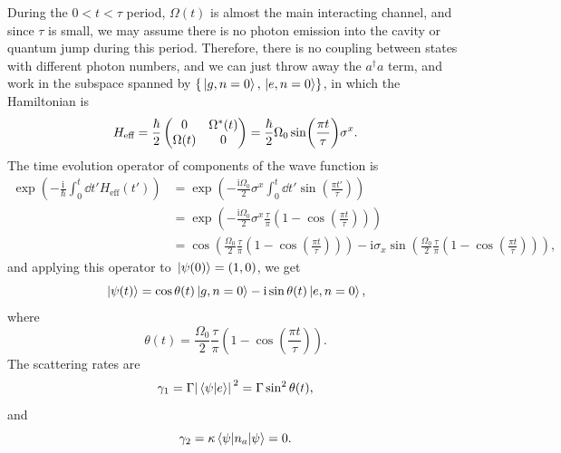 \documentclass[hyperref, a4paper]{article}
\newcommand*{\ii}{\mathrm{i}}
\begin{document}
\begin{itemize}
During the $0 < t < \tau$ period, $\Omega(t)$ is almost the main interacting channel, and since $\tau$ is small,
we may assume there is no photon emission into the cavity or quantum jump during this period.
Therefore, there is no coupling between states with different photon numbers, and we can just throw away 
the $a^\dagger a$ term, and work in the subspace spanned by $\{\ket*{g, n=0}, \ket*{e, n=0}\}$, in which 
the Hamiltonian is 
\begin{equation}
    H_\text{eff} = \frac{\hbar}{2} \pmqty{ 0 & \Omega^*(t) \\ \Omega(t) & 0 } 
    = \frac{\hbar}{2} \Omega_0 \sin(\frac{\pi t}{\tau}) \sigma^x .
\end{equation} 
The time evolution operator of components of the wave function is 
\[
    \begin{aligned}
        \exp(- \frac{\ii}{\hbar} \int_0^t \dd{t'} H_\text{eff}(t')) &= 
        \exp(- \frac{\ii \Omega_0}{2} \sigma^x \int_0^t \dd{t'} \sin(\frac{\pi t'}{\tau}) ) \\
        &= \exp(- \frac{\ii \Omega_0}{2} \sigma^x \frac{\tau}{\pi} \left( 1 - \cos(\frac{\pi t}{\tau}) \right)) \\
        &= \cos(\frac{\Omega_0}{2} \frac{\tau}{\pi} \left( 1 - \cos(\frac{\pi t}{\tau}) \right))
        - \ii \sigma_x \sin(\frac{\Omega_0}{2} \frac{\tau}{\pi} \left( 1 - \cos(\frac{\pi t}{\tau}) \right)),
    \end{aligned}
\]
and applying this operator to $\ket*{\psi(0)} = (1, 0)$, we get 
\begin{equation}
    \ket*{\psi(t)} = \cos \theta(t) \ket*{g, n=0} - \ii \sin \theta(t) \ket*{e, n=0}, 
\end{equation}
where 
\begin{equation}
    \theta(t) = \frac{\Omega_0}{2} \frac{\tau}{\pi} \left( 1 - \cos(\frac{\pi t}{\tau}) \right).
\end{equation}
The scattering rates are 
\begin{equation}
    \gamma_1 = \Gamma \abs*{\braket*{\psi}{e}}^2 = \Gamma \sin^2 \theta(t),
\end{equation}
and 
\begin{equation}
    \gamma_2 = \kappa \expval*{n_a}{\psi} = 0.
\end{equation}


\end{itemize}
\end{document}
